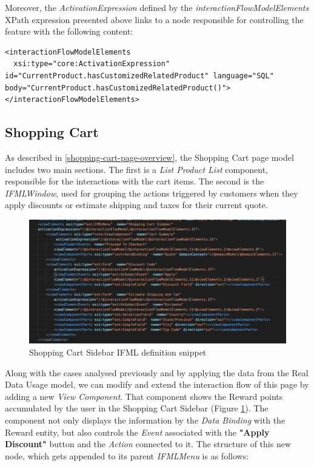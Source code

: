 Moreover, the \textit{ActivationExpression} defined by the \textit{interactionFlowModelElements} XPath expression presented above links to a node responsible for controlling the feature with the following content:

\vspace{0.5cm}
\lstset{language=XML}
\begin{lstlisting} 
<interactionFlowModelElements 
  xsi:type="core:ActivationExpression" id="CurrentProduct.hasCustomizedRelatedProduct" language="SQL" body="CurrentProduct.hasCustomizedRelatedProduct()">
</interactionFlowModelElements>

\end{lstlisting}
\vspace{0.5cm}
\subsection{Shopping Cart}
\label{shopping-cart-updates}

As described in \ref{shopping-cart-page-overview}, the Shopping Cart page model includes two main sections. The first is a \textit{List Product List} component, responsible for the interactions with the cart items. The second is the \textit{IFMLWindow}, used for grouping the actions triggered by customers when they apply discounts or estimate shipping and taxes for their current quote.

\vspace{0.5cm}
\begin{figure}[H]
  \centering
    \includegraphics[width=12cm]{images/madison/ifml-shopping-cart-sidebar.png}
  \caption{Shopping Cart Sidebar IFML definition snippet}
  \label{fig:shopping-cart-sidebar-ifml-definition}
\end{figure}
\vspace{0.5cm}

Along with the cases analysed previously and by applying the data from the Real Data Usage model, we can modify and extend the interaction flow of this page by adding a new \textit{View Component}. That component shows the Reward points accumulated by the user in the Shopping Cart Sidebar (Figure \ref{fig:shopping-cart-sidebar-ifml-definition}). The component not only displays the information by the \textit{Data Binding} with the Reward entity, but also controls the \textit{Event} associated with the \textbf{"Apply Discount"} button and the \textit{Action} connected to it. 
The structure of this new node, which gets appended to its parent \textit{IFMLMenu} is as follows:

